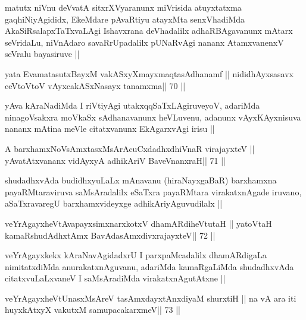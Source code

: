 \begin{artha}
matutx niVnu deVvatA sitxrXVyaranunx miVrisida atuyxtatxma
gaqhiNiyAgididx, EkeMdare pAvaRtiyu atayxMta senxVhadiMda
AkaSiRsalapxTaTxvaLAgi Ishavxrana deVhadalilx adhaRBAgavanunx mAtarx
seVridaLu, niVnAdaro savaRrUpadalilx pUNaRvAgi nananx AtamxvanenxV
seVralu bayasiruve ||
\end{artha}

\begin{shl}
yata EvamatasutxBayxM vakASxyXmayxmaqtasAdhanamf ||
nididhAyxsasavx ceVtoV\s toV vAyxcakASxNasayx tanamxma\hfill || 70 ||
\end{shl}

\begin{artha}
yAva kAraNadiMda I riVtiyAgi utakxqqSaTxLAgiruveyoV, adariMda
ninagoVsakxra moVkaSx sAdhanavanunx heVLuvenu, adanunx vAyxKAyxnisuva
nananx mAtina meVle citatxvanunx EkAgarxvAgi irisu ||
\end{artha}


\begin{shl}
A barxhamxNoV\s sAmxtasxMsArAcuCxdadhxdhiVnaR virajayxteV ||
yAvatAtxvananx vidAyxyA adhikAriV BaveVnanxraH\hfill || 71 ||
\end{shl}

\begin{artha}
shudadhxvAda budidhxyuLaLx mAnavanu (hiraNayxgaBaR) barxhamxna
payaRMtaraviruva saMsAradalilx eSaTxra payaRMtara virakatxnAgade
iruvano, aSaTxravaregU barxhamxvideyxge adhikAriyAguvudilalx ||
\end{artha}

\begin{shl}
veYrAgayxheVtAvapayxsimxnarxkotxV dhamARdiheVtutaH ||
yatoV\s taH kamaRshudAdhxtAmx BavAdasAmxdivxrajayxteV\hfill || 72 ||
\end{shl}

\begin{artha}
veYrAgayxkekx kAraNavAgidadxrU I parxpaMcadalilx dhamARdigaLa
nimitatxdiMda anurakatxnAguvanu, adariMda kamaRgaLiMda shudadhxvAda
citatxvuLaLxvaneV I saMsAradiMda virakatxnAgutAtxne ||
\end{artha}


\begin{shl}
veYrAgayxheVtUnasxMsAreV tasAmxdayxtAnxdiyaM shurxtiH ||
na vA ara iti huyxkAtxyX vakutxM samupacakarxmeV\hfill || 73 ||
\end{shl}

